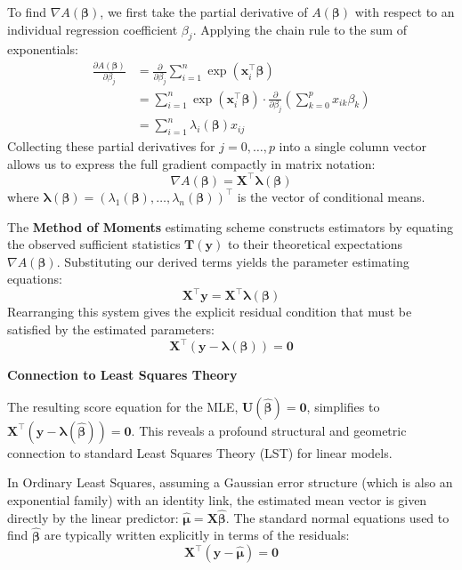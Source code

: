 \documentclass[
  letterpaper,
  DIV=11,
  numbers=noendperiod]{scrreprt}
\renewcommand{\[}{\begin{equation}}
\renewcommand{\]}{\end{equation}}
\theoremstyle{definition}
\theoremstyle{plain}
\theoremstyle{plain}
\theoremstyle{plain}
\theoremstyle{definition}
\theoremstyle{plain}
\theoremstyle{remark}
\begin{document}
\begin{enumerate}
  To find \(\nabla A(\boldsymbol{\beta})\), we first take the partial
  derivative of \(A(\boldsymbol{\beta})\) with respect to an individual
  regression coefficient \(\beta_j\). Applying the chain rule to the sum
  of exponentials: \[
   \begin{aligned}
   \frac{\partial A(\boldsymbol{\beta})}{\partial \beta_j} &= \frac{\partial}{\partial \beta_j} \sum_{i=1}^n \exp\left( \mathbf{x}_i^\top \boldsymbol{\beta} \right) \\
   &= \sum_{i=1}^n \exp\left( \mathbf{x}_i^\top \boldsymbol{\beta} \right) \cdot \frac{\partial}{\partial \beta_j} \left( \sum_{k=0}^p x_{ik} \beta_k \right) \\
   &= \sum_{i=1}^n \lambda_i(\boldsymbol{\beta}) x_{ij}
   \end{aligned}
   \] Collecting these partial derivatives for \(j = 0, \dots, p\) into
  a single column vector allows us to express the full gradient
  compactly in matrix notation: \[
   \nabla A(\boldsymbol{\beta}) = \mathbf{X}^\top \boldsymbol{\lambda}(\boldsymbol{\beta})
   \] where
  \(\boldsymbol{\lambda}(\boldsymbol{\beta}) = (\lambda_1(\boldsymbol{\beta}), \dots, \lambda_n(\boldsymbol{\beta}))^\top\)
  is the vector of conditional means.

  The \textbf{Method of Moments} estimating scheme constructs estimators
  by equating the observed sufficient statistics
  \(\mathbf{T}(\mathbf{y})\) to their theoretical expectations
  \(\nabla A(\boldsymbol{\beta})\). Substituting our derived terms
  yields the parameter estimating equations: \[
   \mathbf{X}^\top \mathbf{y} = \mathbf{X}^\top \boldsymbol{\lambda}(\boldsymbol{\beta})
   \] Rearranging this system gives the explicit residual condition that
  must be satisfied by the estimated parameters: \[
   \mathbf{X}^\top (\mathbf{y} - \boldsymbol{\lambda}(\boldsymbol{\beta})) = \mathbf{0}
   \]
\end{enumerate}

\textbf{Connection to Least Squares Theory}

The resulting score equation for the MLE,
\(\mathbf{U}(\hat{\boldsymbol{\beta}}) = \mathbf{0}\), simplifies to
\(\mathbf{X}^\top (\mathbf{y} - \boldsymbol{\lambda}(\hat{\boldsymbol{\beta}})) = \mathbf{0}\).
This reveals a profound structural and geometric connection to standard
Least Squares Theory (LST) for linear models.

In Ordinary Least Squares, assuming a Gaussian error structure (which is
also an exponential family) with an identity link, the estimated mean
vector is given directly by the linear predictor:
\(\hat{\boldsymbol{\mu}} = \mathbf{X}\hat{\boldsymbol{\beta}}\). The
standard normal equations used to find \(\hat{\boldsymbol{\beta}}\) are
typically written explicitly in terms of the residuals: \[
\mathbf{X}^\top (\mathbf{y} - \hat{\boldsymbol{\mu}}) = \mathbf{0}
\]
\end{document}
